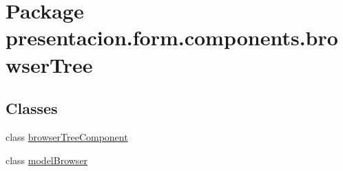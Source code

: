 \hypertarget{namespacepresentacion_1_1form_1_1components_1_1browserTree}{}\section{Package presentacion.\+form.\+components.\+browser\+Tree}
\label{namespacepresentacion_1_1form_1_1components_1_1browserTree}
\subsection*{Classes}
\begin{DoxyCompactItemize}
\item 
class \hyperlink{classpresentacion_1_1form_1_1components_1_1browserTree_1_1browserTreeComponent}{browser\+Tree\+Component}
\item 
class \hyperlink{classpresentacion_1_1form_1_1components_1_1browserTree_1_1modelBrowser}{model\+Browser}
\end{DoxyCompactItemize}
